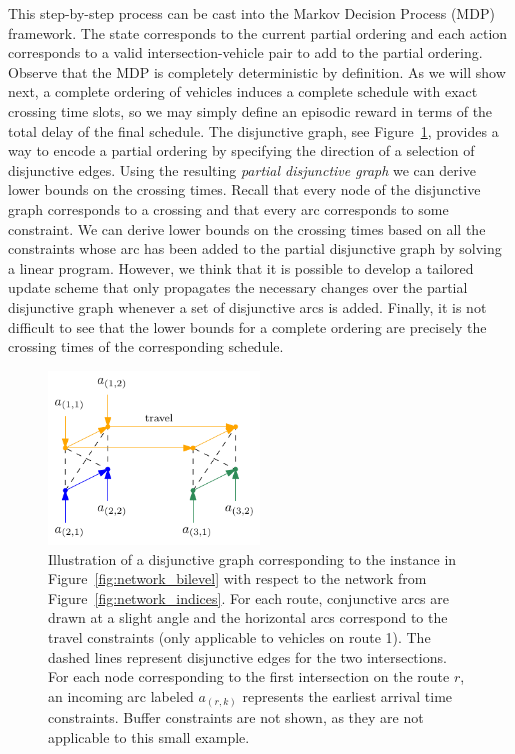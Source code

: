 \documentclass{article}
\theoremstyle{definition}
\theoremstyle{plain}
\begin{document}
This step-by-step process can be cast into the Markov Decision Process (MDP)
framework.
The state corresponds to the current partial ordering and each action
corresponds to a valid intersection-vehicle pair to add to the partial ordering.
Observe that the MDP is completely deterministic by definition. As we will show
next, a complete ordering of vehicles induces a complete schedule with exact
crossing time slots, so we may simply define an episodic reward in terms of the
total delay of the final schedule.
The disjunctive graph, see Figure~\ref{fig:disjunctive_graph}, provides a way to
encode a partial ordering by specifying the direction of a selection of
disjunctive edges.
Using the resulting \textit{partial disjunctive graph} we can derive lower bounds on the crossing
times. Recall that every node of the disjunctive graph corresponds to a crossing
and that every arc corresponds to some constraint. We can derive lower bounds on
the crossing times based on all the constraints whose arc has been added to the
partial disjunctive graph by solving a linear program.
However, we think that it is possible to develop a tailored update scheme that
only propagates the necessary changes over the partial disjunctive graph
whenever a set of disjunctive arcs is added.
Finally, it is not difficult to see that the lower bounds for a complete ordering are
precisely the crossing times of the corresponding schedule.

\begin{figure}[h]
  \centering
  \includegraphics[width=0.5\textwidth]{figures/disjunctive_graph.pdf}
  \caption{Illustration of a disjunctive graph corresponding to the instance in
    Figure~\ref{fig:network_bilevel} with respect to the network from
    Figure~\ref{fig:network_indices}. For each route, conjunctive arcs are drawn
    at a slight angle and the horizontal arcs correspond to the travel
    constraints (only applicable to vehicles on route 1). The dashed lines
    represent disjunctive edges for the two intersections. For each node
    corresponding to the first intersection on the route $r$, an incoming arc
    labeled $a_{(r,k)}$ represents the earliest arrival time constraints. Buffer
    constraints are not shown, as they are not applicable to this small
    example.}
  \label{fig:disjunctive_graph}
\end{figure}
\end{document}
